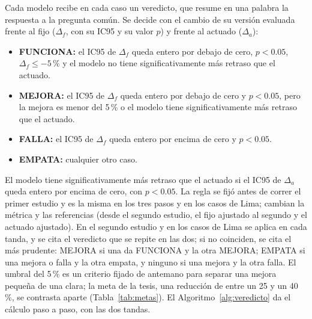 Cada modelo recibe en cada caso un veredicto, que resume en una palabra
la respuesta a la pregunta común. Se decide con el cambio de su versión
evaluada frente al fijo ($\Delta_f$, con su IC95 y su valor $p$) y
frente al actuado ($\Delta_a$):
\begin{itemize}
  \item \textbf{FUNCIONA:} el IC95 de $\Delta_f$ queda entero por
    debajo de cero, $p < 0.05$, $\Delta_f \leq -5$\,\% y el modelo no
    tiene significativamente más retraso que el actuado.
  \item \textbf{MEJORA:} el IC95 de $\Delta_f$ queda entero por debajo
    de cero y $p < 0.05$, pero la mejora es menor del 5\,\% o el modelo
    tiene significativamente más retraso que el actuado.
  \item \textbf{FALLA:} el IC95 de $\Delta_f$ queda entero por encima
    de cero y $p < 0.05$.
  \item \textbf{EMPATA:} cualquier otro caso.
\end{itemize}
El modelo tiene significativamente más retraso que el actuado si el
IC95 de $\Delta_a$ queda entero por encima de cero, con $p < 0.05$. La
regla se fijó antes de correr el primer estudio y es la misma en los
tres pasos y en los casos de Lima; cambian la métrica y las referencias
(desde el segundo estudio, el fijo ajustado al segundo y el actuado
ajustado). En el segundo estudio y en los casos de Lima se aplica en
cada tanda, y se cita el veredicto que se repite en las dos; si no
coinciden, se cita el más prudente: MEJORA si una da FUNCIONA y la otra
MEJORA; EMPATA si una mejora o falla y la otra empata, y ninguno si una
mejora y la otra falla. El umbral del 5\,\% es un criterio fijado de
antemano para separar una mejora pequeña de una clara; la meta de la
tesis, una reducción de entre un 25 y un 40\,\%, se contrasta aparte
(Tabla~\ref{tab:metas}). El Algoritmo~\ref{alg:veredicto} da el cálculo
paso a paso, con las dos tandas.

